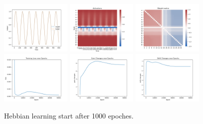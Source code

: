 \documentclass[12pt, a4paper]{article}
\begin{document}
\begin{figure}[H]
    \centering
    \includegraphics[width=0.3\textwidth]{RNN/ourRNN/analysis/fig/0122_SIN2_bphebbpt_output.png}
    \includegraphics[width=0.3\textwidth]{RNN/ourRNN/analysis/fig/0122_SIN2_bphebbpt_activations.png}
    \includegraphics[width=0.3\textwidth]{RNN/ourRNN/analysis/fig/0122_SIN2_bphebbpt_weight_matrix.png}\\
    \includegraphics[width=0.3\textwidth]{RNN/ourRNN/analysis/fig/0122_SIN2_bphebbpt_loss.png}
    \includegraphics[width=0.3\textwidth]{RNN/ourRNN/analysis/fig/0122_SIN2_bphebbpt_gc.png}
    \includegraphics[width=0.3\textwidth]{RNN/ourRNN/analysis/fig/0122_SIN2_bphebbpt_sc.png}\\
    \caption{Hebbian learning start after 1000 epoches.}
\end{figure}
\end{document}
